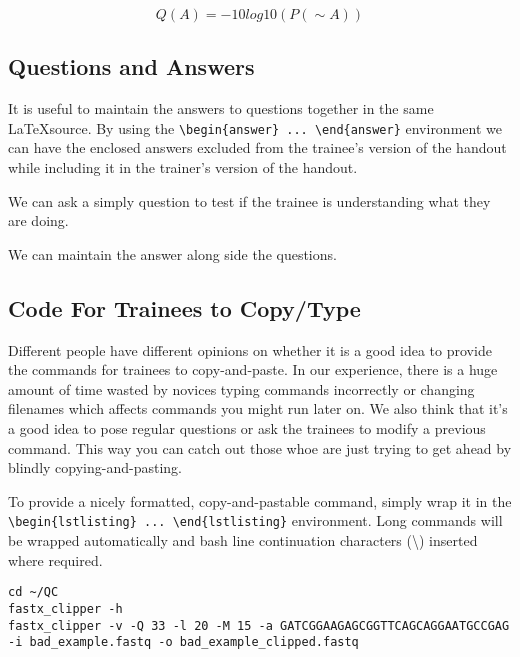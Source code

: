 \begin{displaymath}
Q(A) =-10 log10(P(\sim A))
\end{displaymath} 


\subsection{Questions and Answers}

It is useful to maintain the answers to questions together in the same \LaTeX source. By using the
\verb+\begin{answer} ... \end{answer}+ environment we can have the enclosed answers excluded from
the trainee's version of the handout while including it in the trainer's version of the handout.

\begin{questions}
We can ask a simply question to test if the trainee is understanding what they are doing. 
\begin{answer}
We can maintain the answer along side the questions.
\end{answer}

\end{questions}

\subsection{Code For Trainees to Copy/Type}

Different people have different opinions on whether it is a good idea to provide the commands for
trainees to copy-and-paste. In our experience, there is a huge amount of time wasted by novices
typing commands incorrectly or changing filenames which affects commands you might run later on. We
also think that it's a good idea to pose regular questions or ask the trainees to modify a previous
command. This way you can catch out those whoe are just trying to get ahead by blindly
copying-and-pasting.

To provide a nicely formatted, copy-and-pastable command, simply wrap it in the
\verb+\begin{lstlisting} ... \end{lstlisting}+ environment. Long commands will be wrapped
automatically and bash line continuation characters (\textbackslash) inserted where required.

\begin{steps}
\begin{lstlisting}
cd ~/QC
fastx_clipper -h
fastx_clipper -v -Q 33 -l 20 -M 15 -a GATCGGAAGAGCGGTTCAGCAGGAATGCCGAG -i bad_example.fastq -o bad_example_clipped.fastq
\end{lstlisting}
\end{steps}

